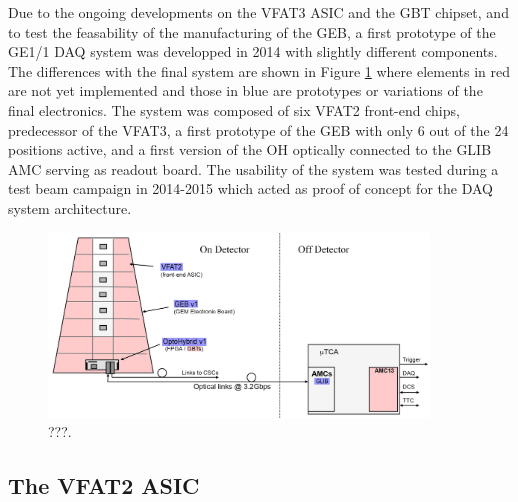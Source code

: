     Due to the ongoing developments on the VFAT3 ASIC and the GBT chipset, and to test the feasability of the manufacturing of the GEB, a first prototype of the GE1/1 DAQ system was developped in 2014 with slightly different components. The differences with the final system are shown in Figure \ref{fig:II-2-daq-gem-system-v1} where elements in red are not yet implemented and those in blue are prototypes or variations of the final electronics. The system was composed of six VFAT2 front-end chips, predecessor of the VFAT3, a first prototype of the GEB with only 6 out of the 24 positions active, and a first version of the OH optically connected to the GLIB AMC serving as readout board. The usability of the system was tested during a test beam campaign in 2014-2015 which acted as proof of concept for the DAQ system architecture.

    \begin{figure}[h!]
      \centering
      \includegraphics[width=0.9\textwidth]{img/II-2-daq/gem-system-v1.pdf}
      \caption{???.}
      \label{fig:II-2-daq-gem-system-v1}
    \end{figure}

    \subsection{The VFAT2 ASIC}

